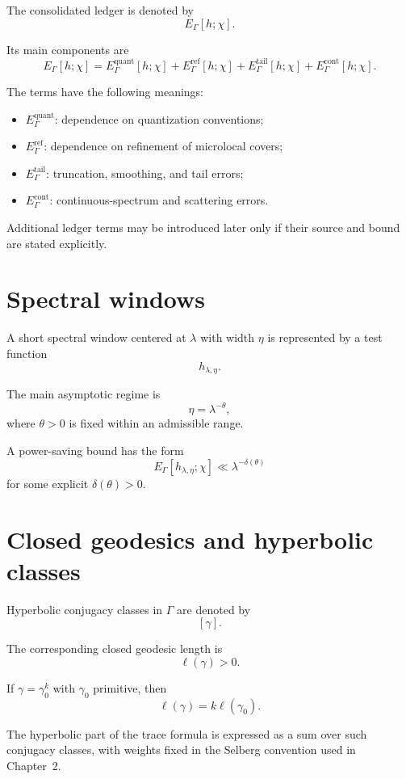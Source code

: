 The consolidated ledger is denoted by
\[
  E_\Gamma[h;\chi].
\]

Its main components are
\[
  E_\Gamma[h;\chi]
  =
  E_\Gamma^{\mathrm{quant}}[h;\chi]
  +
  E_\Gamma^{\mathrm{ref}}[h;\chi]
  +
  E_\Gamma^{\mathrm{tail}}[h;\chi]
  +
  E_\Gamma^{\mathrm{cont}}[h;\chi].
\]

The terms have the following meanings:

\begin{itemize}
  \item \(E_\Gamma^{\mathrm{quant}}\): dependence on quantization conventions;
  \item \(E_\Gamma^{\mathrm{ref}}\): dependence on refinement of microlocal covers;
  \item \(E_\Gamma^{\mathrm{tail}}\): truncation, smoothing, and tail errors;
  \item \(E_\Gamma^{\mathrm{cont}}\): continuous-spectrum and scattering errors.
\end{itemize}

Additional ledger terms may be introduced later only if their source and bound are stated explicitly.

\section*{Spectral windows}

A short spectral window centered at \(\lambda\) with width \(\eta\) is represented by a test function
\[
  h_{\lambda,\eta}.
\]

The main asymptotic regime is
\[
  \eta=\lambda^{-\theta},
\]
where \(\theta>0\) is fixed within an admissible range.

A power-saving bound has the form
\[
  E_\Gamma[h_{\lambda,\eta};\chi]
  \ll
  \lambda^{-\delta(\theta)}
\]
for some explicit \(\delta(\theta)>0\).

\section*{Closed geodesics and hyperbolic classes}

Hyperbolic conjugacy classes in \(\Gamma\) are denoted by
\[
  [\gamma].
\]

The corresponding closed geodesic length is
\[
  \ell(\gamma)>0.
\]

If \(\gamma=\gamma_0^k\) with \(\gamma_0\) primitive, then
\[
  \ell(\gamma)=k\ell(\gamma_0).
\]

The hyperbolic part of the trace formula is expressed as a sum over such conjugacy classes, with weights fixed in the Selberg convention used in Chapter~2.

